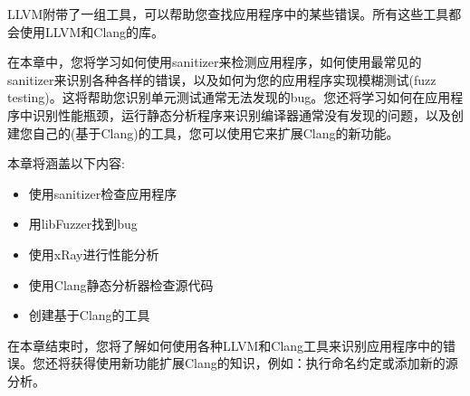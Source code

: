 LLVM附带了一组工具，可以帮助您查找应用程序中的某些错误。所有这些工具都会使用LLVM和Clang的库。\par

在本章中，您将学习如何使用sanitizer来检测应用程序，如何使用最常见的sanitizer来识别各种各样的错误，以及如何为您的应用程序实现模糊测试(fuzz testing)。这将帮助您识别单元测试通常无法发现的bug。您还将学习如何在应用程序中识别性能瓶颈，运行静态分析程序来识别编译器通常没有发现的问题，以及创建您自己的(基于Clang)的工具，您可以使用它来扩展Clang的新功能。\par

本章将涵盖以下内容:\par

\begin{itemize}
\item 使用sanitizer检查应用程序
\item 用libFuzzer找到bug
\item 使用xRay进行性能分析
\item 使用Clang静态分析器检查源代码
\item 创建基于Clang的工具
\end{itemize}

在本章结束时，您将了解如何使用各种LLVM和Clang工具来识别应用程序中的错误。您还将获得使用新功能扩展Clang的知识，例如：执行命名约定或添加新的源分析。\par







